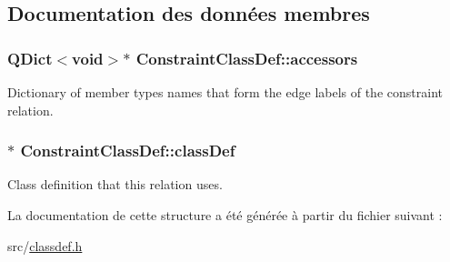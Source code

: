 \subsection{Documentation des données membres}
\hypertarget{struct_constraint_class_def_ac683f0a91d18455baad63d1582aa6e5b}{}
\subsubsection[{accessors}]{\setlength{\rightskip}{0pt plus 5cm}Q\+Dict$<$void$>$$\ast$ Constraint\+Class\+Def\+::accessors}\label{struct_constraint_class_def_ac683f0a91d18455baad63d1582aa6e5b}
Dictionary of member types names that form the edge labels of the constraint relation. \hypertarget{struct_constraint_class_def_a19b68e8a482c234e891caf07a74608ef}{}
\subsubsection[{class\+Def}]{$\ast$ Constraint\+Class\+Def\+::class\+Def}\label{struct_constraint_class_def_a19b68e8a482c234e891caf07a74608ef}
Class definition that this relation uses. 

La documentation de cette structure a été générée à partir du fichier suivant \+:\begin{DoxyCompactItemize}
\item 
src/\hyperlink{classdef_8h}{classdef.\+h}\end{DoxyCompactItemize}
